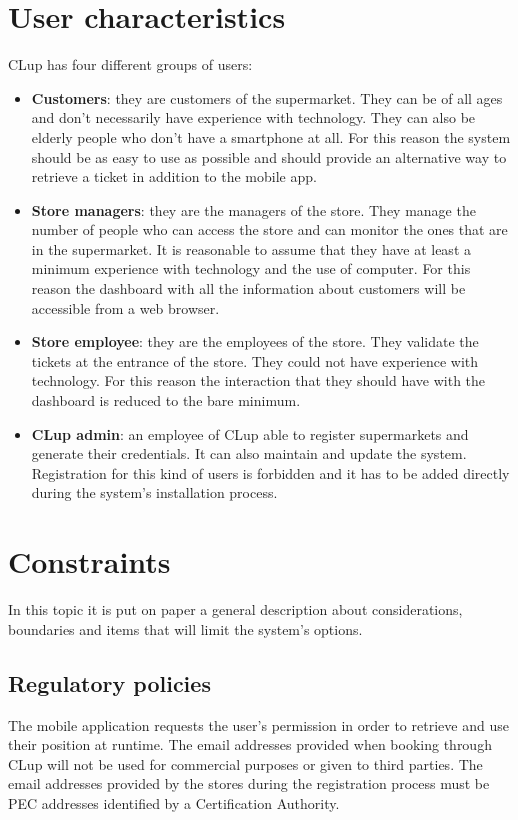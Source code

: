 \section{User characteristics}
CLup has four different groups of users:
\begin{itemize}
	\item \textbf{Customers}: they are customers of the supermarket. They can be of all ages and don't necessarily have experience with technology. They can also be elderly	people who don't have a smartphone at all. For this reason the system should be as easy to use as possible and should provide an alternative way to retrieve a ticket in addition to the mobile app.
	\item \textbf{Store managers}: they are the managers of the store. They manage the number of people who can access the store and can monitor the ones that are in the supermarket. It is reasonable to assume that they have at least a minimum experience with technology and the use of computer. For this reason the dashboard with all the information about customers will be accessible from a web browser.
	\item \textbf{Store employee}: they are the employees of the store. They validate the tickets at the entrance of the store. They could not have experience with technology. For this reason the interaction that they should have with the dashboard is reduced to the bare minimum.
    \item \textbf{CLup admin}: an employee of CLup able to register supermarkets and generate their credentials. It can also maintain and update the system. Registration for this kind of users is forbidden and it has to be added directly during the system's installation process.
\end{itemize}

\section{Constraints}
In this topic it is put on paper a general description about considerations, boundaries and items that will limit the system's options.

\subsection{Regulatory policies}
The mobile application requests the user's permission in order to retrieve and use their position at runtime.\newline
The email addresses provided when booking through CLup will not be used for commercial purposes or given to third parties.\newline
The email addresses provided by the stores during the registration process must be PEC addresses identified by a Certification Authority.

